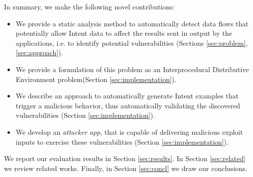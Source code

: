 In summary, we make the following novel contributions:
\begin{itemize}
 \item We provide a static analysis method to automatically detect data flows that potentially allow
 Intent data to affect the results sent in output by the applications, i.e. to identify potential vulnerabilities (Sections \ref{sec:problem}, \ref{sec:approach}). 
 \item We provide a formulation of this problem as an Interprocedural Distributive Environment problem(Section \ref{sec:implementation}). 
 \item We describe an approach to automatically generate Intent examples that trigger a malicious behavior, thus automatically validating the discovered vulnerabilities (Section \ref{sec:implementation}).
 \item We develop an {\em attacker app}, that is capable of delivering malicious exploit inputs to exercise these vulnerabilities (Section \ref{sec:implementation}). 
\end{itemize}

We report our evaluation results in Section \ref{sec:results}. In Section \ref{sec:related} we review  related works. Finally, in Section \ref{sec:concl} we draw our conclusions.

